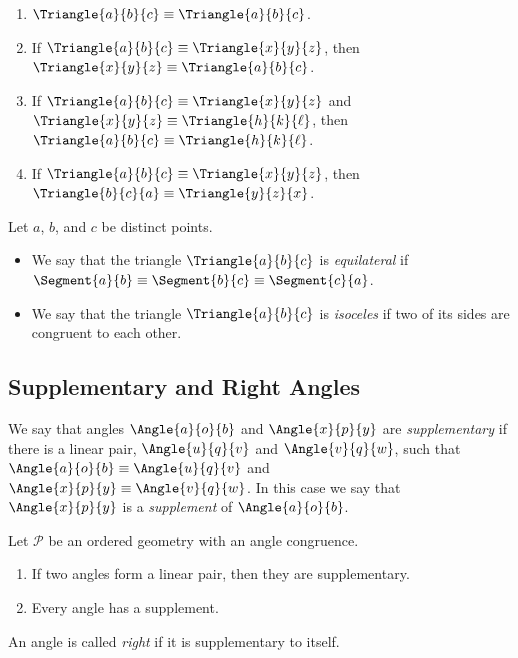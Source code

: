\documentclass{article}
\begin{document}
\begin{prop} \mbox{}
\begin{enumerate}
\item $\Triangle{a}{b}{c} \equiv \Triangle{a}{b}{c}$.
\item If $\Triangle{a}{b}{c} \equiv \Triangle{x}{y}{z}$, then $\Triangle{x}{y}{z} \equiv \Triangle{a}{b}{c}$.
\item If $\Triangle{a}{b}{c} \equiv \Triangle{x}{y}{z}$ and $\Triangle{x}{y}{z} \equiv \Triangle{h}{k}{\ell}$, then $\Triangle{a}{b}{c} \equiv \Triangle{h}{k}{\ell}$.
\item If $\Triangle{a}{b}{c} \equiv \Triangle{x}{y}{z}$, then $\Triangle{b}{c}{a} \equiv \Triangle{y}{z}{x}$.
\end{enumerate}
\end{prop}

\begin{dfn}
Let $a$, $b$, and $c$ be distinct points.
\begin{itemize}
\item We say that the triangle $\Triangle{a}{b}{c}$ is \emph{equilateral} if $\Segment{a}{b} \equiv \Segment{b}{c} \equiv \Segment{c}{a}$.
\item We say that the triangle $\Triangle{a}{b}{c}$ is \emph{isoceles} if two of its sides are congruent to each other.
\end{itemize}
\end{dfn}

\subsection*{Supplementary and Right Angles}

\begin{dfn}
We say that angles $\Angle{a}{o}{b}$ and $\Angle{x}{p}{y}$ are \emph{supplementary} if there is a linear pair, $\Angle{u}{q}{v}$ and $\Angle{v}{q}{w}$, such that $\Angle{a}{o}{b} \equiv \Angle{u}{q}{v}$ and $\Angle{x}{p}{y} \equiv \Angle{v}{q}{w}$. In this case we say that $\Angle{x}{p}{y}$ is a \emph{supplement} of $\Angle{a}{o}{b}$.
\end{dfn}

\begin{prop}
Let $\mathcal{P}$ be an ordered geometry with an angle congruence.
\begin{enumerate}
\item If two angles form a linear pair, then they are supplementary.
\item Every angle has a supplement.
\end{enumerate}
\end{prop}

\begin{dfn}
An angle is called \emph{right} if it is supplementary to itself.
\end{dfn}
\end{document}
